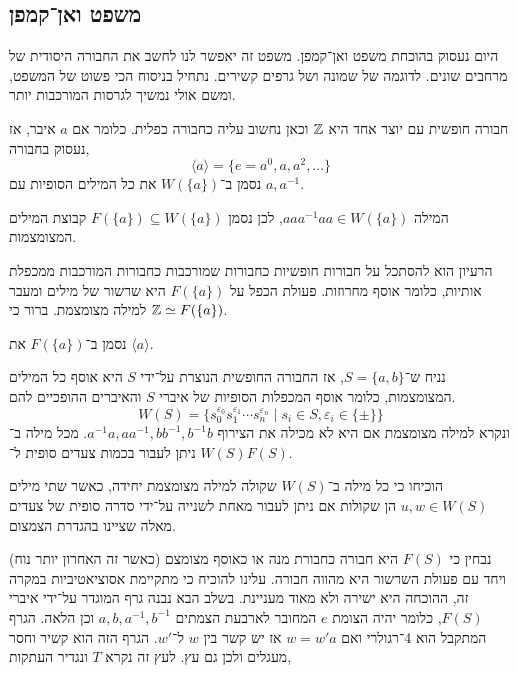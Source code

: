 \subsection{משפט ואן־קמפן}
היום נעסוק בהוכחת משפט ואן־קמפן.
משפט זה יאפשר לנו לחשב את החבורה היסודית של מרחבים שונים.
לדוגמה של שמונה ושל גרפים קשירים.
נתחיל בניסוח הכי פשוט של המשפט, ומשם אולי נמשיך לגרסות המורכבות יותר.
\begin{example}
	חבורה חופשית עם יוצר אחד היא $\mathbb{Z}$ וכאן נחשוב עליה כחבורה כפלית.
	כלומר אם $a$ איבר, אז נעסוק בחבורה,
	\[
		\langle a \rangle
		= \{ e = a^0, a, a^2, \ldots \}
	\]
	נסמן ב־$W(\{ a \})$ את כל המילים הסופיות עם $a, a^{-1}$.
\end{example}
\begin{example}
	המילה $a a a^{-1} a a \in W(\{ a \})$, לכן נסמן $F(\{ a \}) \subseteq W(\{ a \})$ קבוצת המילים המצומצמות.
\end{example}
הרעיון הוא להסתכל על חבורות חופשיות כחבורות שמורכבות כחבורות המורכבות ממכפלת אותיות, כלומר אוסף מחרוזות.
פעולת הכפל על $F(\{ a \})$ היא שרשור של מילים ומעבר למילה מצומצמת.
ברור כי $\mathbb{Z} \simeq F(\{ a \})$.
\begin{notation}
	נסמן ב־$F(\{ a \})$ את $\langle a \rangle$.
\end{notation}
\begin{definition}
	נניח ש־$S = \{ a, b \}$, אז החבורה החופשית הנוצרת על־ידי $S$ היא אוסף כל המילים המצומצמות,
	כלומר אוסף המכפלות הסופיות של איברי $S$ והאיברים ההופכיים להם.
	\[
		W(S)
		= \{ s_0^{\varepsilon_0} s_1^{\varepsilon_1} \cdots s_n^{\varepsilon_n} \mid s_i \in S, \varepsilon_i \in \{ \pm \} \}
	\]
	ונקרא למילה מצומצמת אם היא לא מכילה את הצירוף $a^{-1} a, a a^{-1}, b b^{-1}, b^{-1} b$.
	מכל מילה ב־$W(S)$ ניתן לעבור בכמות צעדים סופית ל־$F(S)$.
\end{definition}
\begin{exercise}
	הוכיחו כי כל מילה ב־$W(S)$ שקולה למילה מצומצמת יחידה, כאשר שתי מילים $u, w \in W(S)$ הן שקולות אם ניתן לעבור מאחת לשנייה על־ידי סדרה סופית של צעדים מאלה שציינו בהגדרת הצמצום.
\end{exercise}
נבחין כי $F(S)$ היא חבורה כחבורת מנה או כאוסף מצומצם (כאשר זה האחרון יותר נוח) ויחד עם פעולת השרשור היא מהווה חבורה.
עלינו להוכיח כי מתקיימת אסוציאטיביות במקרה זה, ההוכחה היא ישירה ולא מאוד מעניינת.
בשלב הבא נבנה גרף המוגדר על־ידי איברי $F(S)$, כלומר יהיה הצומת $e$ המחובר לארבעת הצמתים $a, b, a^{-1}, b^{-1}$ וכן הלאה.
הגרף המתקבל הוא 4־רגולרי ואם $w = w' a$ אז יש קשר בין $w$ ל־$w'$.
הגרף הזה הוא קשיר וחסר מעגלים ולכן גם עץ.
לעץ זה נקרא $T$ ונגדיר העתקות,
